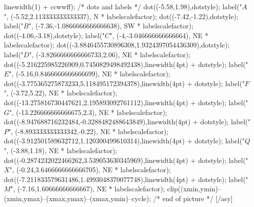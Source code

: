 \documentclass[12pt]{article}
\begin{document}
linewidth(1) + ccwwff); /* dots and labels */ dot((-5.58,1.98),dotstyle); label("$A$", (-5.52,2.113333333333337), N * labelscalefactor); dot((-7.42,-1.22),dotstyle); label("$B$", (-7.36,-1.0866666666666638), SW * labelscalefactor); dot((-4.06,-3.18),dotstyle); label("$C$", (-4,-3.046666666666664), NE * labelscalefactor); dot((-3.8846455730896308,1.9324397054436309),dotstyle); label("$D$", (-3.8266666666666733,2.06), NE * labelscalefactor); dot((-5.216225985226909,0.7450829498492438),linewidth(4pt) + dotstyle); label("$E$", (-5.16,0.8466666666666699), NE * labelscalefactor); dot((-3.775365275873233,5.118495172394378),linewidth(4pt) + dotstyle); label("$F$", (-3.72,5.22), NE * labelscalefactor); dot((-13.275816730447621,2.195893092761112),linewidth(4pt) + dotstyle); label("$G$", (-13.226666666666675,2.3), NE * labelscalefactor); dot((-8.947688716232484,-0.3288482488643849),linewidth(4pt) + dotstyle); label("$P$", (-8.893333333333342,-0.22), NE * labelscalefactor); dot((-3.912501589632712,1.120300499610314),linewidth(4pt) + dotstyle); label("$Q$", (-3.88,1.18), NE * labelscalefactor); dot((-0.2874232022466262,3.539053630345969),linewidth(4pt) + dotstyle); label("$X$", (-0.24,3.6466666666666705), NE * labelscalefactor); dot((-7.211833579631486,1.4993048370077748),linewidth(4pt) + dotstyle); label("$M$", (-7.16,1.60666666666667), NE * labelscalefactor); clip((xmin,ymin)--(xmin,ymax)--(xmax,ymax)--(xmax,ymin)--cycle); /* end of picture */ [/asy]
\end{document}
